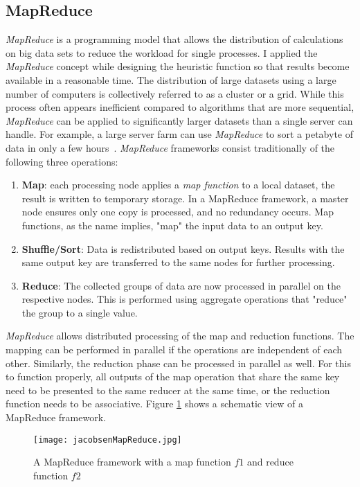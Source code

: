 \subsection{MapReduce}
\textit{MapReduce} is a programming model that allows the distribution of calculations on big data sets to reduce the workload for single processes. I applied the \textit{MapReduce} concept while designing the heuristic function so that results become available in a reasonable time. The distribution of large datasets using a large number of computers is collectively referred to as a cluster or a grid. While this process often appears inefficient compared to algorithms that are more sequential, \textit{MapReduce} can be applied to significantly larger datasets than a single server can handle. For example, a large server farm can use \textit{MapReduce} to sort a petabyte of data in only a few hours~\cite{Czajkowski2011}. \textit{MapReduce} frameworks consist traditionally of the following three operations:
\begin{enumerate}
	\item \textbf{Map}: each processing node applies a \textit{map function} to a local dataset, the result is written to temporary storage. In a MapReduce framework, a master node ensures only one copy is processed, and no redundancy occurs. Map functions, as the name implies, "map" the input data to an output key.
	\item \textbf{Shuffle/Sort}: Data is redistributed based on output keys. Results with the same output key are transferred to the same nodes for further processing.
	\item \textbf{Reduce}: The collected groups of data are now processed in parallel on the respective nodes. This is performed using aggregate operations that "reduce" the group to a single value.
\end{enumerate}
\textit{MapReduce} allows distributed processing of the map and reduction functions. The mapping can be performed in parallel if the operations are independent of each other. Similarly, the reduction phase can be processed in parallel as well. For this to function properly, all outputs of the map operation that share the same key need to be presented to the same reducer at the same time, or the reduction function needs to be associative. Figure \ref{fig:mapReduce} shows a schematic view of a MapReduce framework.~\cite{Dean2008}
\begin{figure}
	\centering
	\texttt{[image: jacobsenMapReduce.jpg]}
	\caption{A MapReduce framework with a map function $f1$ and reduce function $f2$~\cite{Dean2008}}
	\label{fig:mapReduce}
\end{figure}
